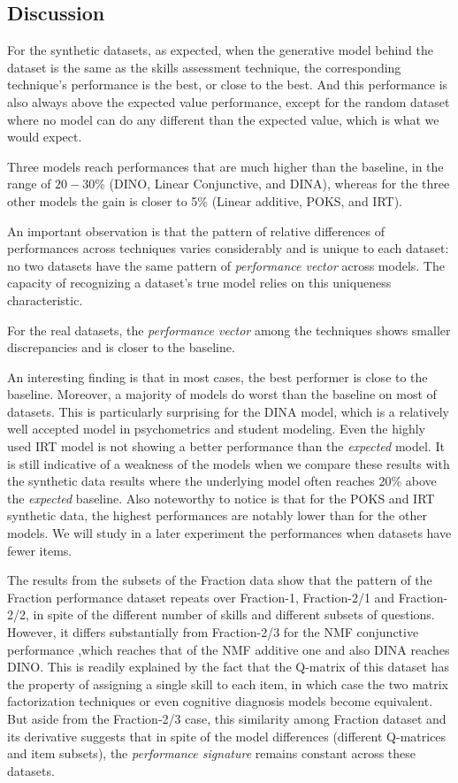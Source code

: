 \subsection{Discussion}

For the synthetic datasets, as expected, when the generative model behind the dataset is the same as the skills assessment technique, the corresponding technique's performance is the best, or close to the best. And this performance is also always above the expected value performance, except for the random dataset where no model can do any different than the expected value, which is what we would expect.

Three models reach performances that are much higher than the baseline, in the range of $20-30$\% (DINO, Linear Conjunctive, and DINA), whereas for the three other models the gain is closer to 5\% (Linear additive, POKS, and IRT).

An important observation is that the pattern of relative differences of performances across techniques varies considerably and is unique to each dataset: no two datasets have the same pattern of \textit{performance vector} across models. The capacity of recognizing a dataset's true model relies on this uniqueness characteristic.

For the real datasets, the \textit{performance vector} among the techniques shows smaller discrepancies and is closer to the baseline. 

An interesting finding is that in most cases, the best performer is close to the baseline. Moreover, a majority of models do worst than the baseline on most of datasets. This is particularly surprising for the DINA model, which is a relatively well accepted model in psychometrics and student modeling. Even the highly used IRT model is not showing a better performance than the \textit{expected} model. It is still indicative of a weakness of the models when we compare these results with the synthetic data results where the underlying model often reaches 20\% above the \textit{expected} baseline. Also noteworthy to notice is that for the POKS and IRT synthetic data, the highest performances are notably lower than for the other models. We will study in a later experiment the performances when datasets have fewer items.

The results from the subsets of the Fraction data show that the pattern of the Fraction performance dataset repeats over Fraction-1, Fraction-2/1 and Fraction-2/2, in spite of the different number of skills and different subsets of questions. However, it differs substantially from Fraction-2/3 for the NMF conjunctive performance ,which reaches that of the NMF additive one and also DINA reaches DINO. This is readily explained by the fact that the Q-matrix of this dataset has the property of assigning a single skill to each item, in which case the two matrix factorization techniques or even cognitive diagnosis models become equivalent. But aside from the Fraction-2/3 case, this similarity among Fraction dataset and its derivative suggests that in spite of the model differences (different Q-matrices and item subsets), the \textit{performance signature} remains constant across these datasets.

